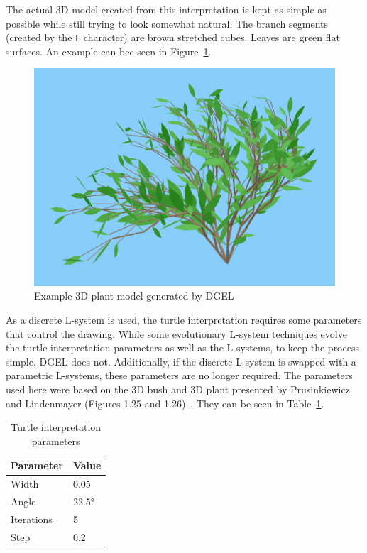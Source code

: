 The actual 3D model created from this interpretation is kept as simple as possible while still trying to look somewhat natural.
The branch segments (created by the \texttt{F} character) are brown stretched cubes.
Leaves are green flat surfaces.
An example can bee seen in Figure~\ref{fig:example-model}.

\begin{figure}
    \centering
    \includegraphics[width=1.0\textwidth]{figures/example-plant}
    \caption[Example 3D plant model generated by DGEL]{Example 3D plant model generated by \gls{DGEL}}
    \label{fig:example-model}
\end{figure}

As a discrete \gls{L-system} is used, the turtle interpretation requires some parameters that control the drawing.
While some evolutionary \gls{L-system} techniques evolve the turtle interpretation parameters as well as the \glspl{L-system}, to keep the process simple, \gls{DGEL} does not.
Additionally, if the discrete \gls{L-system} is swapped with a parametric \glspl{L-system}, these parameters are no longer required.
The parameters used here were based on the 3D bush and 3D plant presented by Prusinkiewicz and Lindenmayer (Figures 1.25 and 1.26)~\cite{2012Prusinkiewicz}.
They can be seen in Table~\ref{tab:turtle-param}.

\begin{table}
    \centering
    \begin{tabular}{| l | l |}
    \hline
    \textbf{Parameter} & \textbf{Value} \\ \hline
    Width & 0.05 \\ \hline
    Angle & 22.5° \\ \hline
    Iterations & 5 \\ \hline
    Step & 0.2 \\
    \hline
    \end{tabular}
    \caption{Turtle interpretation parameters}
    \label{tab:turtle-param}
\end{table}

